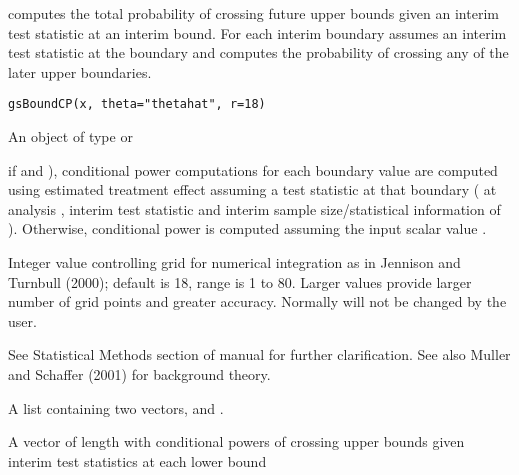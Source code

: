\begin{Description}\relax
{} computes the total probability of crossing future upper bounds
given an interim test statistic at an interim bound.
For each interim boundary
assumes an interim test statistic at the boundary and
computes the probability of crossing any of the later upper boundaries.
\end{Description}
\begin{Usage}
\begin{verbatim}
gsBoundCP(x, theta="thetahat", r=18)
\end{verbatim}
\end{Usage}
\begin{Arguments}
\begin{ldescription}
\item[\code{x}] An object of type  or 
\item[\code{theta}] if  and ), conditional power computations for
each boundary value are computed using estimated treatment effect assuming a test statistic at that boundary
( at analysis , interim test statistic  and interim 
sample size/statistical information of ). Otherwise, conditional power is computed
assuming the input scalar value .

\item[\code{r}] Integer value controlling grid for numerical integration as in Jennison and Turnbull (2000); 
default is 18, range is 1 to 80. 
Larger values provide larger number of grid points and greater accuracy.
Normally  will not be changed by the user.
\end{ldescription}
\end{Arguments}
\begin{Details}\relax
See Statistical Methods section of manual for further clarification. See also Muller and Schaffer (2001) for background theory.
\end{Details}
\begin{Value}
A list containing two vectors,  and .
\begin{ldescription}
\item[\code{CPlo}] A vector of length  with conditional powers of crossing upper bounds
given interim test statistics at each lower bound
\end{ldescription}

\end{Value}
